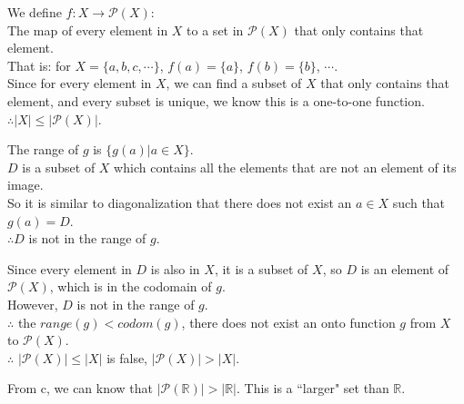 \documentclass[12pt]{exam}
\begin{document}
\begin{solution}
    \begin{qparts}
        \item
        We define $f: X \rightarrow \mathcal{P}(X)$: \\
        The map of every element in $X$ to a set in $\mathcal{P}(X)$ that 
        only contains that element.\\
        That is: for $X = \{a,b,c,\cdots\}$, $f(a) = \{a\}$, $f(b) = \{b\}$, $\cdots$.\\
        Since for every element in $X$, we can find a subset of $X$ that only contains that element, 
        and every subset is unique, we know this is a one-to-one function.\\
        $\therefore |X| \leq |\mathcal{P}(X)|$.
        \item
        The range of $g$ is $\{ g(a) | a \in X\}$. \\
        $D$ is a subset of $X$ which contains all the elements that are not an element of its image.\\
        So it is similar to diagonalization that there does not exist an $a \in X$ such that $g(a) = D$.\\
        $\therefore D$ is not in the range of $g$.
        \item
        Since every element in $D$ is also in $X$, it is a subset of $X$, so $D$ is an element of $\mathcal{P}(X)$, which is 
        in the codomain of $g$.\\
        However, $D$ is not in the range of $g$.\\
        $\therefore$ the $range(g) < codom(g)$, there does not exist an onto function $g$ from $X$ to $\mathcal{P}(X)$.\\
        $\therefore$ $|\mathcal{P}(X)| \leq |X|$ is false, $|\mathcal{P}(X)| > |X|$.
        \item
        From c, we can know that $| \mathcal{P}(\mathbb{R}) | > |\mathbb{R}|$. This is a ``larger" set than $\mathbb{R}$.

    \end{qparts}
\end{solution}
\end{document}
